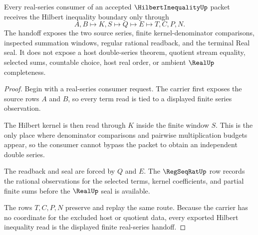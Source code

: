 \begin{theorem}
\label{thm:hilbert-inequality-real-series-handoff}
Every real-series consumer of an accepted $\HilbertInequalityUp$ packet receives the Hilbert inequality boundary only through
$$
A,B \longmapsto K,S \longmapsto Q \longmapsto E \longmapsto T,C,P,N .
$$
The handoff exposes the two source series, finite kernel-denominator comparisons, inspected summation windows, regular rational readback, and the terminal Real seal. It does not expose a host double-series theorem, quotient stream equality, selected sums, countable choice, host real order, or ambient $\RealUp$ completeness.
\end{theorem}
\begin{proof}
Begin with a real-series consumer request. The carrier first exposes the source rows $A$ and $B$, so every term read is tied to a displayed finite series observation.

The Hilbert kernel is then read through $K$ inside the finite window $S$. This is the only place where denominator comparisons and pairwise multiplication budgets appear, so the consumer cannot bypass the packet to obtain an independent double series.

The readback and seal are forced by $Q$ and $E$. The $\RegSeqRatUp$ row records the rational observations for the selected terms, kernel coefficients, and partial finite sums before the $\RealUp$ seal is available.

The rows $T,C,P,N$ preserve and replay the same route. Because the carrier has no coordinate for the excluded host or quotient data, every exported Hilbert inequality read is the displayed finite real-series handoff.
\end{proof}



